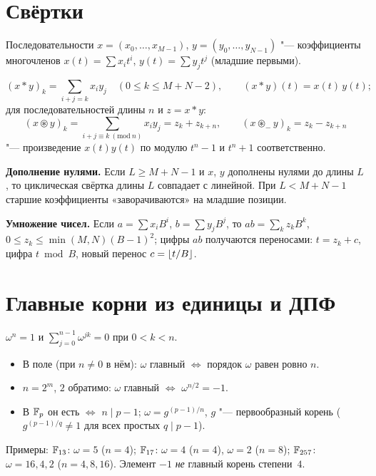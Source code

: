 \documentclass{ca-handout}
\begin{document}
\makehandouttitle

\section{Свёртки}
Последовательности $x = (x_0, \dots, x_{M-1})$, $y = (y_0, \dots, y_{N-1})$ "--- коэффициенты
многочленов $x(t) = \sum x_i t^i$, $y(t) = \sum y_j t^j$ (младшие первыми).

\begin{reminder}[title={Линейная, циклическая и негациклическая свёртки}]
\[
  (x * y)_k = \sum_{i + j = k} x_i y_j \quad (0 \le k \le M + N - 2), \qquad (x * y)(t) = x(t)\,y(t);
\]
для последовательностей длины $n$ и $z = x * y$:
\[
  (x \circledast y)_k = \sum_{i + j \equiv k\ (\mathrm{mod}\ n)} x_i y_j = z_k + z_{k+n}, \qquad
  (x \circledast_{-} y)_k = z_k - z_{k+n}
\]
"--- произведение $x(t)y(t)$ по модулю $t^n - 1$ и $t^n + 1$ соответственно.
\end{reminder}

\textbf{Дополнение нулями.} Если $L \ge M + N - 1$ и $x$, $y$ дополнены нулями до длины $L$,
то циклическая свёртка длины $L$ совпадает с линейной. При $L < M + N - 1$ старшие коэффициенты
«заворачиваются» на младшие позиции.

\textbf{Умножение чисел.} Если $a = \sum x_i B^i$, $b = \sum y_j B^j$, то
$ab = \sum_k z_k B^k$, $0 \le z_k \le \min(M, N)(B - 1)^2$; цифры $ab$ получаются переносами:
$t = z_k + c$, цифра $t \bmod B$, новый перенос $c = \lfloor t / B\rfloor$.

\section{Главные корни из единицы и ДПФ}

\begin{reminder}[title={Главный корень степени $n$ из единицы в кольце $R$}]
$\omega^n = 1$ и $\sum_{j=0}^{n-1} \omega^{jk} = 0$ при $0 < k < n$.
\begin{itemize}
  \item В поле (при $n \ne 0$ в нём): $\omega$ главный $\iff$ порядок $\omega$ равен ровно $n$.
  \item $n = 2^m$, $2$ обратимо: $\omega$ главный $\iff$ $\omega^{n/2} = -1$.
  \item В $\mathbb{F}_{p}$ он есть $\iff$ $n \mid p - 1$; $\omega = g^{(p-1)/n}$, $g$ "--- первообразный корень
    ($g^{(p-1)/q} \ne 1$ для всех простых $q \mid p - 1$).
\end{itemize}
\end{reminder}
Примеры: $\mathbb{F}_{13}$: $\omega = 5$ ($n = 4$); $\mathbb{F}_{17}$: $\omega = 4$ ($n = 4$), $\omega = 2$ ($n = 8$);
$\mathbb{F}_{257}$: $\omega = 16, 4, 2$ ($n = 4, 8, 16$). Элемент $-1$ \emph{не} главный корень степени~$4$.
\end{document}
